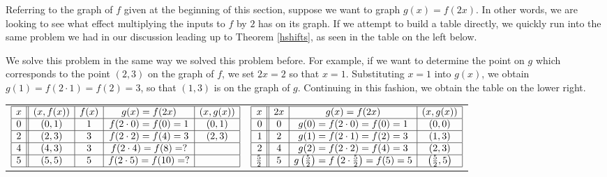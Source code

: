 \documentclass{ximera}
\begin{document}
\smallskip

Referring to the graph of $f$ given at the beginning of this section, suppose we want to graph $g(x) = f(2x)$.  In other words, we are looking to see what effect multiplying the inputs to $f$ by $2$ has on its graph.  If we attempt to build a table directly, we quickly run into the same problem we had in our discussion leading up to Theorem \ref{hshifts}, as seen in the table on the left below.  

\smallskip

We solve this problem in the same way we solved this problem before.  For example, if we want to determine the point on $g$ which corresponds to the point $(2,3)$ on the graph of $f$,  we set $2x =2 $ so that $x=1$.  Substituting $x=1$ into $g(x)$, we obtain $g(1) = f(2 \cdot 1) = f(2) = 3$, so that $(1,3)$ is on the graph of $g$. Continuing in this fashion, we obtain the table on the lower right.   

\smallskip

\begin{tabular}{cc}

$ \begin{array}{|c||c|c|c|c|}  

\hline

x & (x,f(x)) & f(x)& g(x)=f(2x) & (x, g(x)) \\ \hline
0  & (0,1)& 1 & f(2 \cdot 0) = f(0) = 1   &(0, 1) \\  \hline
2 & (2,3) & 3 & f(2\cdot2) = f(4) = 3  &(2,3) \\  \hline
4 & (4,3) & 3 &  f(2 \cdot 4) = f(8) = ? &  \\  \hline
5 & (5,5) & 5 & f(2 \cdot 5) = f(10) = ?  &  \\  \hline

\end{array} $ 

&

$ \begin{array}{|r||c|c|c|}  

\hline

x & 2x & g(x)=f(2x) & (x, g(x)) \\ \hline
0 & 0 & g(0)= f(2 \cdot 0) = f(0) = 1   &(0, 0) \\  \hline
1 &  2 &  g(1)=f(2 \cdot 1) = f(2)  = 3  &(1,3) \\  \hline
2 & 4  & g(2)=f(2 \cdot 2) = f(4) = 3 &  (2,3)\\  \hline
\frac{5}{2}  & 5 & g\left(\frac{5}{2}\right)=f\left(2 \cdot \frac{5}{2} \right) = f(5) = 5  & \left(\frac{5}{2},5\right) \\   \hline

\end{array} $

\end{tabular} 
\end{document}

